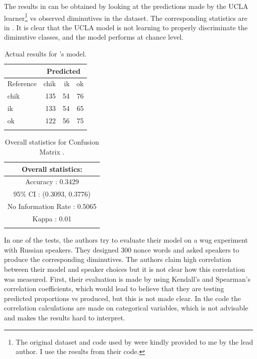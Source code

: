 The results in  can be obtained by looking at the predictions made by the UCLA learner\footnote{The original dataset and code used by \textcite{Gouskova.2015} were kindly provided to me by the lead author. I use the results from their code.} vs observed diminutives in the dataset. The corresponding statistics are in . It is clear that the UCLA model is not learning to properly discriminate the diminutive classes, and the model performs at chance level.

\begin{table}
  \centering
  \begin{tabular}{lrrr}
    \lsptoprule
    & \multicolumn{3}{c}{Predicted} \\
    \midrule
    Reference & chik & ik & ok                \\
    chik      & 135  & 54 & 76                \\
    ik        & 133  & 54 & 65                \\
    ok        & 122  & 56 & 75                \\
    \lspbottomrule
  \end{tabular}
  \caption{Actual results for \textcite{Gouskova.2015}'s model.}\label{tab:test-gkn-model}
\end{table}

\begin{table}
  \centering
  \begin{tabular}{c}
    \lsptoprule
    Overall statistics:          \\
    \midrule
    Accuracy : 0.3429\\
    95\% CI : (0.3093, 0.3776)\\
    No Information Rate : 0.5065\\
    Kappa : 0.01\\
    \lspbottomrule
  \end{tabular}
  \caption{Overall statistics for Confusion Matrix .}\label{tab:test-gkn-stats}
\end{table}

In one of the tests, the authors try to evaluate their model on a wug experiment with Russian speakers. They designed 300 nonce words and asked speakers to produce the corresponding diminutives. The authors claim high correlation between their model and speaker choices but it is not clear how this correlation was measured. First, their evaluation is made by using Kendall's and Spearman's correlation coefficients, which would lead to believe that they are testing predicted proportions vs produced, but this is not made clear. In the code the correlation calculations are made on categorical variables, which is not advisable and makes the results hard to interpret.

